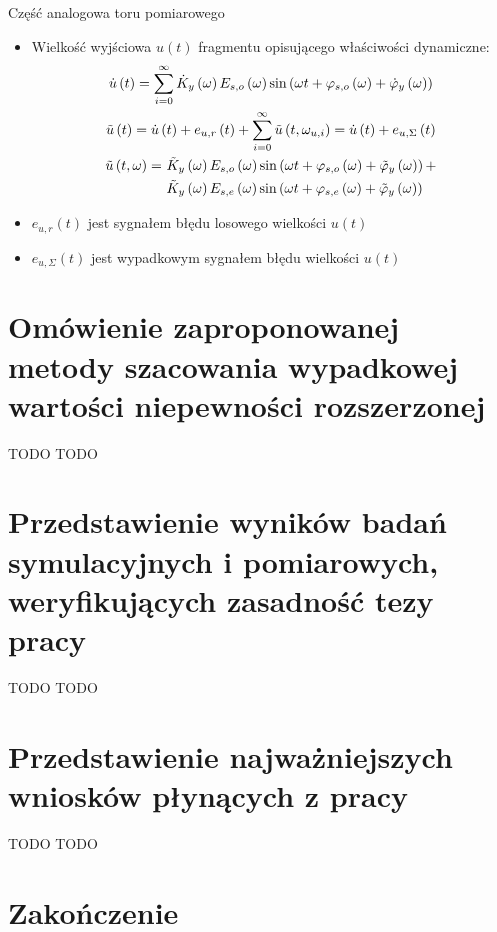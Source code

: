 \documentclass[12pt, polish, aspectratio = 169]{beamer}
\begin{document}
\begin{frame}{Część analogowa toru pomiarowego}
\begin{itemize}
\item Wielkość wyjściowa $u(t)$ fragmentu opisującego właściwości dynamiczne:
\begin{gather}
\dot{u} \left(t\right) = \sum _{i = 0} ^{\infty} \dot{K}_{y} \left(\omega\right) E_{s,o} \left(\omega\right) \sin \left( \omega t + \varphi_{s,o} \left(\omega\right) + \dot{\varphi}_{y} \left(\omega\right) \right) \label{eq:mid_cont_sum_ideal} \\
\tilde{u} \left(t\right) = \dot{u} \left(t\right) + e_{u,r} \left(t\right) + \sum _{i = 0} ^{\infty} \tilde{u} \left( t, \omega_{u,i} \right) = \dot{u} \left(t\right) + e_{u,\Sigma} \left(t\right) \label{eq:mid_cont_sum_real} \\
\begin{split}
\tilde{u} \left(t,\omega\right) =~
& \tilde{K}_{y} \left(\omega\right) E_{s,o} \left(\omega\right) \sin \left( \omega t + \varphi_{s,o} \left(\omega\right) + \tilde{\varphi}_{y} \left(\omega\right) \right) + \\
& \tilde{K}_{y} \left(\omega\right) E_{s,e} \left(\omega\right) \sin \left( \omega t + \varphi_{s,e} \left(\omega\right) + \tilde{\varphi}_{y} \left(\omega\right) \right)
\end{split}
\label{eq:mid_cont_omega_real}
\end{gather}
\item $e_{u,r}(t)$ jest sygnałem błędu losowego wielkości $u(t)$
\item $e_{u,\Sigma}(t)$ jest wypadkowym sygnałem błędu wielkości $u(t)$
\end{itemize}
\end{frame}

\section{Omówienie zaproponowanej metody szacowania wypadkowej wartości niepewności rozszerzonej}

\begin{frame}{TODO}
TODO
\end{frame}

\section{Przedstawienie wyników badań symulacyjnych i pomiarowych, weryfikujących zasadność tezy pracy}

\begin{frame}{TODO}
TODO
\end{frame}

\section{Przedstawienie najważniejszych wniosków płynących z pracy}

\begin{frame}{TODO}
TODO
\end{frame}

\section*{Zakończenie}

\begin{frame}[plain]
\lastpage
\end{frame}
\end{document}
